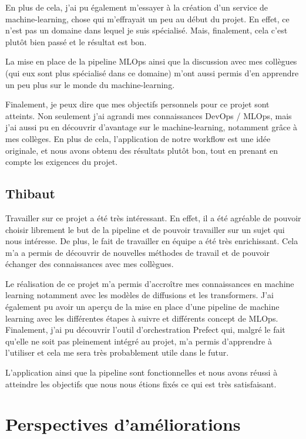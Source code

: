 En plus de cela, j'ai pu également m'essayer à la création d'un service de machine-learning, chose qui m'effrayait un peu au début du projet. En effet, ce n'est pas un domaine dans lequel je suis spécialisé. Mais, finalement, cela c'est plutôt bien passé et le résultat est bon. 

La mise en place de la pipeline MLOps ainsi que la discussion avec mes collègues (qui eux sont plus spécialisé dans ce domaine) m'ont aussi permis d'en apprendre un peu plus sur le monde du machine-learning.

Finalement, je peux dire que mes objectifs personnels pour ce projet sont atteints. Non seulement j'ai agrandi mes connaissances DevOps / MLOps, mais j'ai aussi pu en découvrir d'avantage sur le machine-learning, notamment grâce à mes collèges. En plus de cela, l'application de notre workflow est une idée originale, et nous avons obtenu des résultats plutôt bon, tout en prenant en compte les exigences du projet.

\subsection*{Thibaut}
Travailler sur ce projet a été très intéressant. En effet, il a été agréable de pouvoir choisir librement le but de la pipeline et de pouvoir travailler sur un sujet qui nous intéresse. De plus, le fait de travailler en équipe a été très enrichissant. Cela m'a a permis de découvrir de nouvelles méthodes de travail et de pouvoir échanger des connaissances avec mes collègues.

Le réalisation de ce projet m'a permis d'accroître mes connaissances en machine learning notamment avec les modèles de diffusions et les transformers. J'ai également pu avoir un aperçu de la mise en place d'une pipeline de machine learning avec les différentes étapes à suivre et différents concept de MLOps. Finalement, j'ai pu découvrir l'outil d'orchestration Prefect qui, malgré le fait qu'elle ne soit pas pleinement intégré au projet, m'a permis d'apprendre à l'utiliser et cela me sera très probablement utile dans le futur.

L'application ainsi que la pipeline sont fonctionnelles et nous avons réussi à atteindre les objectifs que nous nous étions fixés ce qui est très satisfaisant.

\section{Perspectives d'améliorations}

